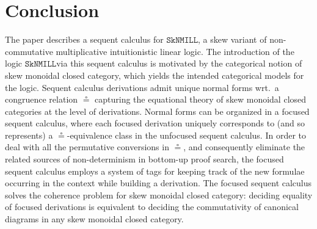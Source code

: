 \documentclass[copyright,creativecommons]{eptcs}
\newtheorem{theorem}{Theorem}[section]
\theoremstyle{definition}
\newcommand{\RI}{\mathsf{RI}}
\newcommand{\SkNMILL}{$\mathtt{SkNMILL}$}
\begin{document}
\vspace{-.5cm}
\section{Conclusion}

The paper describes a sequent calculus for \SkNMILL, a skew variant of non-commutative multiplicative intuitionistic linear logic. The introduction of the logic \SkNMILL via this sequent calculus is motivated by the categorical notion of skew monoidal closed category, which yields the intended categorical models for the logic. Sequent calculus derivations admit unique normal forms wrt.\ a congruence relation $\circeq$ capturing the equational theory of skew monoidal closed categories at the level of derivations. Normal forms can be organized in a focused sequent calculus, where each focused derivation uniquely corresponds to (and so represents) a $\circeq$-equivalence class in the unfocused sequent calculus. In order to deal with all the permutative conversions in $\circeq$, and consequently eliminate the related sources of non-determinism in bottom-up proof search, the focused sequent calculus employs a system of tags for keeping track of the new formulae occurring in the context while building a derivation. The focused sequent calculus solves the coherence problem for skew monoidal closed category: deciding equality of focused derivations is equivalent to deciding the commutativity of canonical diagrams in any skew monoidal closed category.
\end{document}
